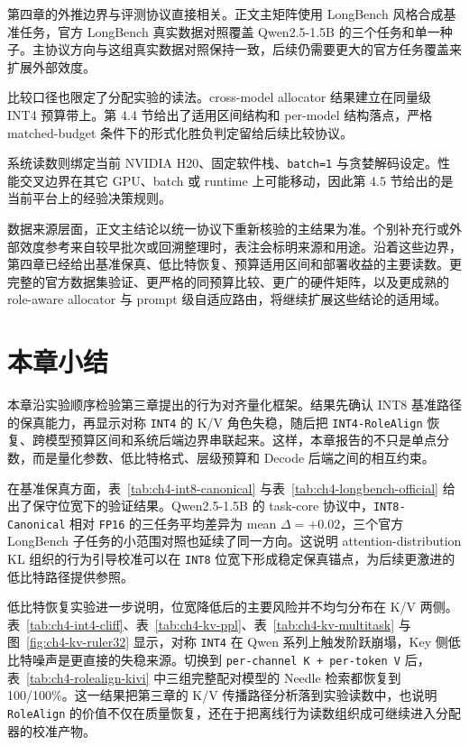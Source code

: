 第四章的外推边界与评测协议直接相关。正文主矩阵使用 LongBench 风格合成基准任务，官方 LongBench 真实数据对照覆盖 Qwen2.5-1.5B 的三个任务和单一种子。主协议方向与这组真实数据对照保持一致，后续仍需要更大的官方任务覆盖来扩展外部效度。

比较口径也限定了分配实验的读法。cross-model allocator 结果建立在同量级 INT4 预算带上。第 4.4 节给出了适用区间结构和 per-model 结构落点，严格 matched-budget 条件下的形式化胜负判定留给后续比较协议。

系统读数则绑定当前 NVIDIA H20、固定软件栈、\texttt{batch=1} 与贪婪解码设定。性能交叉边界在其它 GPU、batch 或 runtime 上可能移动，因此第 4.5 节给出的是当前平台上的经验决策规则。

数据来源层面，正文主结论以统一协议下重新核验的主结果为准。个别补充行或外部效度参考来自较早批次或回溯整理时，表注会标明来源和用途。沿着这些边界，第四章已经给出基准保真、低比特恢复、预算适用区间和部署收益的主要读数。更完整的官方数据集验证、更严格的同预算比较、更广的硬件矩阵，以及更成熟的 role-aware allocator 与 prompt 级自适应路由，将继续扩展这些结论的适用域。

\section{本章小结}
\label{sec:ch4-summary}

本章沿实验顺序检验第三章提出的行为对齐量化框架。结果先确认 INT8 基准路径的保真能力，再显示对称 \texttt{INT4} 的 K/V 角色失稳，随后把 \texttt{INT4-RoleAlign} 恢复、跨模型预算区间和系统后端边界串联起来。这样，本章报告的不只是单点分数，而是量化参数、低比特格式、层级预算和 Decode 后端之间的相互约束。

在基准保真方面，表~\ref{tab:ch4-int8-canonical} 与表~\ref{tab:ch4-longbench-official} 给出了保守位宽下的验证结果。Qwen2.5-1.5B 的 task-core 协议中，\texttt{INT8-Canonical} 相对 \texttt{FP16} 的三任务平均差异为 mean $\Delta=+0.02$，三个官方 LongBench 子任务的小范围对照也延续了同一方向。这说明 attention-distribution KL 组织的行为引导校准可以在 \texttt{INT8} 位宽下形成稳定保真锚点，为后续更激进的低比特路径提供参照。

低比特恢复实验进一步说明，位宽降低后的主要风险并不均匀分布在 K/V 两侧。表~\ref{tab:ch4-int4-cliff}、表~\ref{tab:ch4-kv-ppl}、表~\ref{tab:ch4-kv-multitask} 与图~\ref{fig:ch4-kv-ruler32} 显示，对称 \texttt{INT4} 在 Qwen 系列上触发阶跃崩塌，Key 侧低比特噪声是更直接的失稳来源。切换到 \texttt{per-channel K + per-token V} 后，表~\ref{tab:ch4-rolealign-kivi} 中三组完整配对模型的 Needle 检索都恢复到 100/100\%。这一结果把第三章的 K/V 传播路径分析落到实验读数中，也说明 \texttt{RoleAlign} 的价值不仅在质量恢复，还在于把离线行为读数组织成可继续进入分配器的校准产物。

